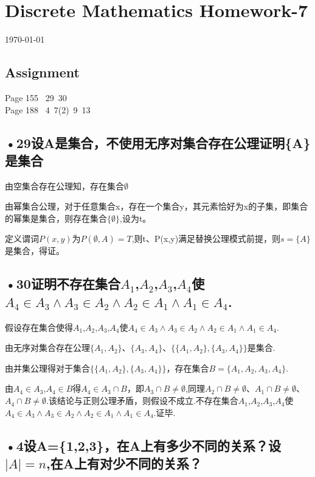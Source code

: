 \documentclass[UTF8]{ctexart}
\begin{document}
\section*{Discrete Mathematics Homework-7}
\begin{center}
\today
\end{center}
\subsection*{Assignment}

Page 155 \ 29\ 30
\\

Page 188 \ 4\ 7(2)\ 9\ 13

\subsection*{•29设A是集合，不使用无序对集合存在公理证明\{A\}是集合}

由空集合存在公理知，存在集合$\emptyset$

由幂集合公理，对于任意集合x，存在一个集合y，其元素恰好为x的子集，即集合的幂集是集合，则存在集合$\{\emptyset\}$,设为t。

定义谓词$P(x,y)$为$P(\emptyset ,A)=T$,则t、P(x,y)满足替换公理模式前提，则$s=\{A\}$是集合，得证。


\subsection*{•30证明不存在集合$A_1$,$A_2$,$A_3$,$A_4$使$A_4\in A_3\wedge A_3\in A_2\wedge A_2\in A_1\wedge A_1\in A_4 $.}

假设存在集合使得$A_1$,$A_2$,$A_3$,$A_4$使$A_4\in A_3\wedge A_3\in A_2\wedge A_2\in A_1\wedge A_1\in A_4 $.

由无序对集合存在公理$\{A_1,A_2\}$、$\{A_3,A_4\}$、$\{\{A_1,A_2\},\{A_3,A_4\}\}$是集合.

由并集公理得对于集合$\{\{A_1,A_2\},\{A_3,A_4\}\}$，存在集合$B=\{A_1,A_2,A_3,A_4\}$.

由$A_4\in A_3$,$A_4\in B$得$A_4\in A_3\cap B$，即$A_3\cap B\neq \emptyset$,同理$A_2\cap B\neq \emptyset$、$A_1\cap B\neq \emptyset$、$A_4\cap B\neq \emptyset$.该结论与正则公理矛盾，则假设不成立.不存在集合$A_1$,$A_2$,$A_3$,$A_4$使$A_4\in A_3\wedge A_3\in A_2\wedge A_2\in A_1\wedge A_1\in A_4 $.证毕.

\subsection*{•4设A=\{1,2,3\}，在A上有多少不同的关系？设$\mid A\mid =n$,在A上有对少不同的关系？}
\end{document}

